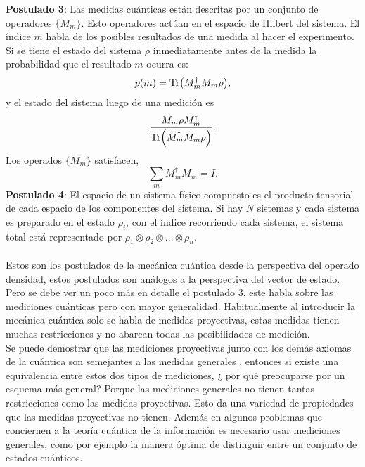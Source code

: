 \textbf{Postulado 3}: Las medidas cuánticas están descritas por un conjunto de operadores $ \{  M_{m} \}$. Esto operadores actúan en el espacio de Hilbert del sistema. El índice $m$ habla de los posibles resultados de una medida al hacer el experimento. Si se tiene el estado del sistema $\rho$ inmediatamente antes de la medida la probabilidad que el resultado $m$ ocurra es:
\begin{equation}
p(m)= \Tr (M^{\dagger}_{m}M_{m} \rho),
\end{equation}
y el estado del sistema luego de una medición es
\begin{equation}
\frac{M_{m} \rho M_{m}^{\dagger}}{\Tr(M^{\dagger}_{m}M_{m} \rho)}.
\end{equation}
Los operados $\{  M_{m} \}$ satisfacen,
\begin{equation}
\sum_{m} M^{\dagger}_{m}M_{m} = I.
\end{equation}
\textbf{Postulado 4}: El espacio de un sistema físico compuesto es el producto tensorial de cada espacio de los componentes del sistema. Si  hay $N$ sistemas y cada sistema es preparado en el estado $\rho_{i}$, con el índice recorriendo cada sistema, el sistema total está representado por $\rho_{1} \otimes \rho_{2} \otimes ...\otimes \rho_{n}$.
\\
\\
Estos son los postulados de la mecánica cuántica desde la perspectiva del operado densidad, estos postulados son análogos a la perspectiva del vector de estado. Pero se debe ver un poco más en detalle el postulado 3, este habla sobre las mediciones cuánticas pero con mayor generalidad. Habitualmente al introducir la mecánica cuántica solo se habla de medidas proyectivas, estas medidas tienen muchas restricciones y no abarcan todas las posibilidades de medición.
\\	
Se puede demostrar que las mediciones proyectivas junto con los demás axiomas de la cuántica son semejantes a las medidas generales \cite{NielsenInformation}, entonces si existe una equivalencia entre estos dos tipos de mediciones, ¿  por qué preocuparse por un esquema más general? Porque las mediciones generales no tienen tantas restricciones como las medidas proyectivas. Esto da una variedad de propiedades que las medidas proyectivas no tienen. Además en algunos problemas que conciernen a la teoría cuántica de la información es necesario usar mediciones generales, como por ejemplo la manera óptima de distinguir entre un conjunto de estados cuánticos.
\\
